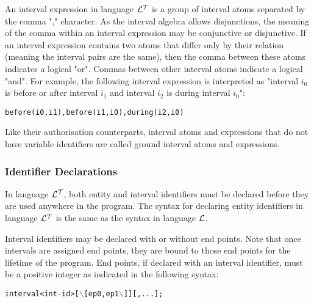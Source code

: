\documentclass[11pt]{report}
\newenvironment{vverbatim}
{
  \begin{alltt}
}
{
  \vspace{-\baselineskip}
  \end{alltt}
}
\begin{document}
\begin{itemize}
              An interval expression in language ${\cal L^T}$ is a group
              of interval atoms separated by the comma "," character. As the
              interval algebra allows disjunctions, the meaning of the comma
              within an interval expression may be conjunctive or disjunctive.
              If an interval expression contains two atoms that differ only by
              their relation (meaning the interval pairs are the same), then
              the comma between these atoms indicates a logical "or". Commas
              between other interval atoms indicate a logical "and". For
              example, the following interval expression is interpreted as
              "interval $i_0$ is before or after interval $i_1$ and interval
              $i_2$ is during interval $i_0$":

              \begin{vverbatim}
  before(i0, i1), before(i1, i0), during(i2, i0)
              \end{vverbatim}

              Like their authorisation counterparts, interval atoms and
              expressions that do not have variable identifiers are called
              ground interval atoms and expressions.

          \end{itemize}

        \subsubsection{Identifier Declarations}

          In language ${\cal L^T}$, both entity and interval identifiers must
          be declared before they are used anywhere in the program. The syntax
          for declaring entity identifiers in language ${\cal L^T}$ is the same
          as the syntax in language ${\cal L}$.

          Interval identifiers may be declared with or without end points. Note
          that once intervals are assigned end points, they are bound to those
          end points for the lifetime of the program. End points, if declared
          with an interval identifier, must be a positive integer as indicated
          in the following syntax:

          \begin{vverbatim}
  interval <int-id> [\(\backslash\)[ep0, ep1\(\backslash\)]][, ... ];
          \end{vverbatim}
\end{document}

